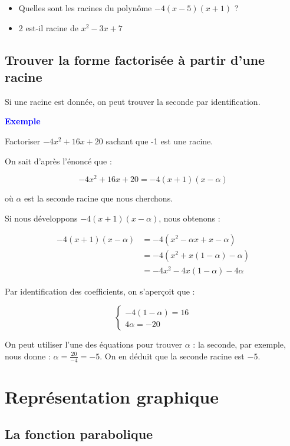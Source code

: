 \documentclass[a4paper,12pt]{article}
\begin{document}
\begin{itemize}[noitemsep]
  \item Quelles sont les racines du polynôme $-4(x - 5)(x + 1)$ ?
  \item 2 est-il racine de \(x^2 - 3x + 7\) 
\end{itemize}

\subsection*{Trouver la forme factorisée à partir d'une racine}

Si une racine est donnée, on peut trouver la seconde par identification.

\textbf{\textcolor{blue}{Exemple}} \par 

Factoriser $-4x^2 + 16x + 20$ sachant que -1 est une racine.

On sait d'après l'énoncé que :

\[
-4x^2 + 16x + 20 = -4(x + 1)(x - \alpha)
\]

où $\alpha$ est la seconde racine que nous cherchons.

Si nous développons $-4(x + 1)(x - \alpha)$, nous obtenons :

\begin{align}
  -4(x + 1)(x - \alpha) &= -4(x^2 - \alpha x + x - \alpha) \\
  &= -4(x^2 + x(1 - \alpha) - \alpha) \\
  &= -4x^2 - 4x(1 - \alpha) - 4\alpha
\end{align}

Par identification des coefficients, on s'aperçoit que :


\begin{equation*}
\begin{cases}
    -4(1 - \alpha) = 16  \\
    4\alpha = -20 
\end{cases}
\end{equation*}

On peut utiliser l'une des équations pour trouver $\alpha$ : la seconde, par exemple, nous donne : $\alpha = \frac{20}{-4} = -5$. On en déduit que la seconde racine est $-5$.

\section*{Représentation graphique}

\subsection*{La fonction parabolique}
\end{document}
